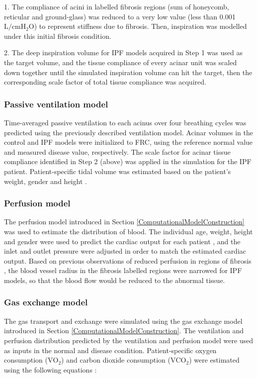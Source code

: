 1. The compliance of acini in labelled fibrosis regions (sum of honeycomb, reticular and ground-glass) was reduced to a very low value (less than 0.001 $\mathrm{L/cmH_2O}$) to represent stiffness due to fibrosis. Then, inspiration was modelled under this initial fibrosis condition.

2. The deep inspiration volume for IPF models acquired in Step 1 was used as the target volume, and the tissue compliance of every acinar unit was scaled down together until the simulated inspiration volume can hit the target, then the corresponding scale factor of total tissue compliance was acquired.

\subsubsection{Passive ventilation model}
Time-averaged passive ventilation to each acinus over four breathing cycles was predicted using the previously described ventilation model. Acinar volumes in the control and IPF models were initialized to FRC, using the reference normal value and measured disease value, respectively. The scale factor for acinar tissue compliance identified in Step 2 (above) was applied in the simulation for the IPF patient. Patient-specific tidal volume was estimated based on the patient's weight, gender and height \citep{gilbert1972changes, pelosi1998effects}.

\subsubsection{Perfusion model}
The perfusion model introduced in Section \ref{ComputationalModelConstruction} was used to estimate the distribution of blood. The individual age, weight, height and gender were used to predict the cardiac output for each patient \citep{brandfonbrener1955changes, miyamura1973maximum, stelfox2006hemodynamic}, and the inlet and outlet pressure were adjusted in order to match the estimated cardiac output. Based on previous observations of reduced perfusion in regions of fibrosis \citep{crystal1976idiopathic, strickland1993cause, plantier2018physiology}, the blood vessel radius in the fibrosis labelled regions were narrowed for IPF models, so that the blood flow would be reduced to the abnormal tissue.

\subsubsection{Gas exchange model}
The gas transport and exchange were simulated using the gas exchange model introduced in Section \ref{ComputationalModelConstruction}. The ventilation and perfusion distribution predicted by the ventilation and perfusion model were used as inputs in the normal and disease condition. Patient-specific oxygen consumption ($\mathrm{VO_2}$) and carbon dioxide consumption ($\mathrm{VCO_2}$) were estimated using the following equations \citep{kwan2004standard, coelho2013estimation}:

